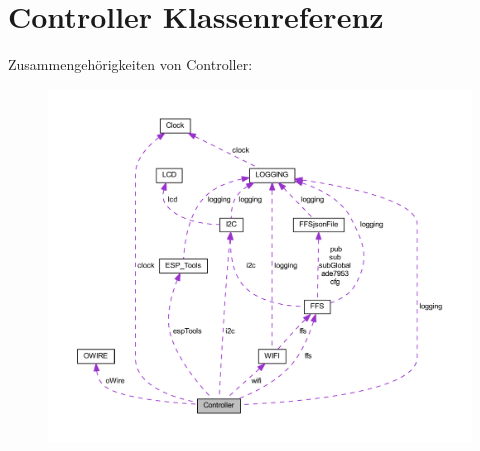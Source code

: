\hypertarget{class_controller}{}\section{Controller Klassenreferenz}
\label{class_controller}


Zusammengehörigkeiten von Controller\+:
\nopagebreak
\begin{figure}[H]
\begin{center}
\leavevmode
\includegraphics[width=350pt]{class_controller__coll__graph}
\end{center}
\end{figure}
